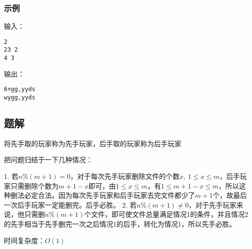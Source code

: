 \subsubsection{示例}
输入：
\begin{lstlisting}
2
23 2
4 3
\end{lstlisting}

输出：
\begin{lstlisting}
6+gg,yyds
wygg,yyds
\end{lstlisting}

\subsection{题解}

将先手取的玩家称为先手玩家，后手取的玩家称为后手玩家

把问题归结于一下几种情况：

1. 若$n \% (m + 1) =0$，对于每次先手玩家删除文件的个数$x, \ 1 \leq x \leq m$，后手玩家只需删除个数为$m + 1 -x$即可，由$1 \leq x \leq m$，有$1 \leq m + 1 - x \leq m$，所以这种删法必定合法。因为每次先手玩家和后手玩家去完文件都少了$m + 1$个，故最后一次后手玩家一定能删完。后手必胜。
2. 若$n \% (m + 1) \neq 0$，对于先手玩家来说，他只需删$n \% (m + 1)$个文件，即可使文件总量满足情况1的条件，并且情况2的先手相当于先手删完一次之后情况1的后手，转化为情况1，所以先手必胜。

时间复杂度：$O(1)$



